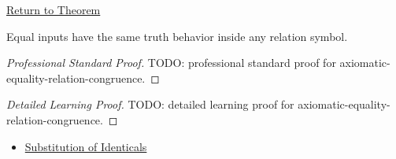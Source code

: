 \newpage
{}
\label{prf:axiomatic-equality-relation-congruence}

\begin{remark*}[Return]
\hyperref[thm:axiomatic-equality-relation-congruence]{Return to Theorem}
\end{remark*}

\begin{theorem*}
Equal inputs have the same truth behavior inside any relation symbol.
\end{theorem*}

\begin{proof}[Professional Standard Proof]
\LRAProofBodyStart
TODO: professional standard proof for axiomatic-equality-relation-congruence.
\end{proof}

\begin{proof}[Detailed Learning Proof]
\LRAProofBodyStart
TODO: detailed learning proof for axiomatic-equality-relation-congruence.
\end{proof}

\begin{remark*}
\end{remark*}

\begin{dependencies}
\begin{itemize}
  \item \hyperref[ax:axiomatic-equality-substitution]{Substitution of Identicals}
\end{itemize}
\end{dependencies}

\clearpage
